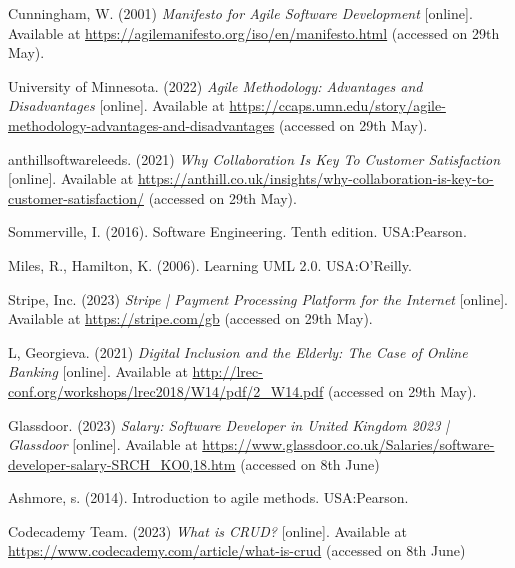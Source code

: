\noindent [10] Cunningham, W. (2001) \textit{Manifesto for Agile Software Development} [online]. Available at \url{https://agilemanifesto.org/iso/en/manifesto.html} (accessed on 29th May).
\vspace{0.2cm}

\noindent [11] University of Minnesota. (2022) \textit{Agile Methodology: Advantages and Disadvantages} [online]. Available at \url{https://ccaps.umn.edu/story/agile-methodology-advantages-and-disadvantages} (accessed on 29th May).
\vspace{0.2cm}

\noindent [12] anthillsoftwareleeds. (2021) \textit{Why Collaboration Is Key To Customer Satisfaction} [online]. Available at \url{https://anthill.co.uk/insights/why-collaboration-is-key-to-customer-satisfaction/} (accessed on 29th May).
\vspace{0.2cm}

\noindent [13] Sommerville, I. (2016). Software Engineering. Tenth edition. USA:Pearson.
\vspace{0.2cm}

\noindent [14] Miles, R., Hamilton, K. (2006). Learning UML 2.0. USA:O'Reilly.
\vspace{0.2cm}

\noindent [15] Stripe, Inc. (2023) \textit{Stripe | Payment Processing Platform for the Internet} [online]. Available at \url{https://stripe.com/gb} (accessed on 29th May).
\vspace{0.2cm}

\noindent [16] L, Georgieva. (2021) \textit{Digital Inclusion and the Elderly: The Case of Online Banking} [online]. Available at \url{http://lrec-conf.org/workshops/lrec2018/W14/pdf/2_W14.pdf} (accessed on 29th May).
\vspace{0.2cm}

\noindent [17] Glassdoor. (2023) \textit{Salary: Software Developer in United Kingdom 2023 | Glassdoor} [online]. Available at \url{https://www.glassdoor.co.uk/Salaries/software-developer-salary-SRCH_KO0,18.htm} (accessed on 8th June)
\vspace{0.2cm}

\noindent [18] Ashmore, s. (2014). Introduction to agile methods. USA:Pearson.
\vspace{0.2cm}

\noindent [19] Codecademy Team. (2023) \textit{What is CRUD?} [online]. Available at \url{https://www.codecademy.com/article/what-is-crud} (accessed on 8th June)
\vspace{0.2cm}


